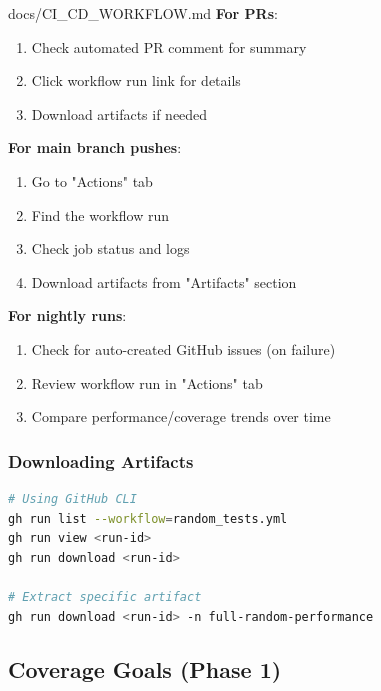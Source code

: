 \begin{relocated}{docs/CI_CD_WORKFLOW.md}
\textbf{For PRs}:

\begin{enumerate}
\def\labelenumi{\arabic{enumi}.}
\tightlist
\item
  Check automated PR comment for summary
\item
  Click workflow run link for details
\item
  Download artifacts if needed
\end{enumerate}

\textbf{For main branch pushes}:

\begin{enumerate}
\def\labelenumi{\arabic{enumi}.}
\tightlist
\item
  Go to "Actions" tab
\item
  Find the workflow run
\item
  Check job status and logs
\item
  Download artifacts from "Artifacts" section
\end{enumerate}

\textbf{For nightly runs}:

\begin{enumerate}
\def\labelenumi{\arabic{enumi}.}
\tightlist
\item
  Check for auto-created GitHub issues (on failure)
\item
  Review workflow run in "Actions" tab
\item
  Compare performance/\allowbreak{}coverage trends over time
\end{enumerate}

\subsubsection{Downloading Artifacts}\label{um:flow:ci-cd-workflow:downloading-artifacts}

\begin{lstlisting}[language=bash]
# Using GitHub CLI
gh run list --workflow=random_tests.yml
gh run view <run-id>
gh run download <run-id>

# Extract specific artifact
gh run download <run-id> -n full-random-performance
\end{lstlisting}

\subsection{Coverage Goals (Phase 1)}\label{um:flow:ci-cd-workflow:coverage-goals-phase-1}


\end{relocated}
